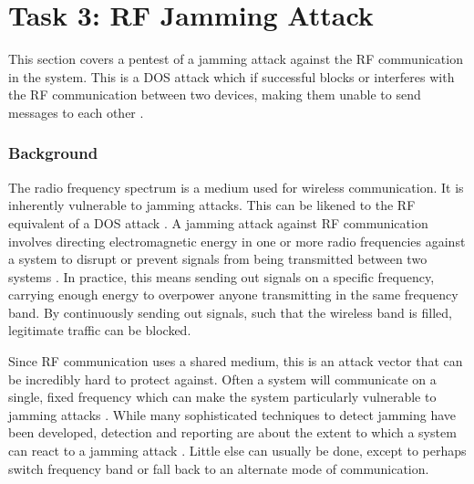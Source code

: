 \section{Task 3: RF Jamming Attack}\label{ch:pentesting:rf-jamming}
This section covers a pentest of a jamming attack against the RF communication in the system. This is a \gls{DOS} attack which if successful blocks or interferes with the RF communication between two devices, making them unable to send messages to each other \cite{hacking-the-iot-talk}.

\subsubsection{Background}
The radio frequency spectrum is a medium used for wireless communication. It is inherently vulnerable to jamming attacks. This can be likened to the RF equivalent of a \gls{DOS} attack \cite{hacking-the-iot-talk}. A jamming attack against RF communication involves directing electromagnetic energy in one or more radio frequencies against a system to disrupt or prevent signals from being transmitted between two systems \cite{adamy2004ew}. In practice, this means sending out signals on a specific frequency, carrying enough energy to overpower anyone transmitting in the same frequency band. By continuously sending out signals, such that the wireless band is filled, legitimate traffic can be blocked.

Since RF communication uses a shared medium, this is an attack vector that can be incredibly hard to protect against. Often a system will communicate on a single, fixed frequency which can make the system particularly vulnerable to jamming attacks \cite{jamming-feasibility}. While many sophisticated techniques to detect jamming have been developed, detection and reporting are about the extent to which a system can react to a jamming attack \cite{optimal-jamming-defense}. Little else can usually be done, except to perhaps switch frequency band or fall back to an alternate mode of communication.

